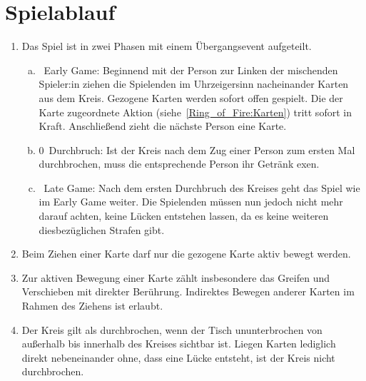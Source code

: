 \section{Spielablauf}
\begin{enumerate}[label={(\arabic*)}]
	\item
	Das Spiel ist in zwei Phasen mit einem Übergangsevent aufgeteilt.
	\begin{enumerate}[a.]
		\item
~\glqq{}Early Game\grqq{}:
		Beginnend mit der Person zur Linken der mischenden Spieler:in ziehen die Spielenden im Uhrzeigersinn nacheinander Karten aus dem Kreis.
		Gezogene Karten werden sofort offen gespielt.
		Die der Karte zugeordnete Aktion (siehe~\ref{Ring_of_Fire:Karten}) tritt sofort in Kraft.
		Anschließend zieht die nächste Person eine Karte.
		\item
0~\glqq{}Durchbruch\grqq{}:
		Ist der Kreis nach dem Zug einer Person zum ersten Mal durchbrochen, muss die entsprechende Person ihr Getränk exen.
		\item
~\glqq{}Late Game\grqq{}:
		Nach dem ersten Durchbruch des Kreises geht das Spiel wie im Early Game weiter.
		Die Spielenden müssen nun jedoch nicht mehr darauf achten, keine Lücken entstehen lassen, da es keine weiteren diesbezüglichen Strafen gibt.
	\end{enumerate}

	\item
	Beim Ziehen einer Karte darf nur die gezogene Karte aktiv bewegt werden.

	\item
	Zur aktiven Bewegung einer Karte zählt insbesondere das Greifen und Verschieben mit direkter Berührung.
	Indirektes Bewegen anderer Karten im Rahmen des Ziehens ist erlaubt.

	\item
	Der Kreis gilt als durchbrochen, wenn der Tisch ununterbrochen von außerhalb bis innerhalb des Kreises sichtbar ist.
	Liegen Karten lediglich direkt nebeneinander ohne, dass eine Lücke entsteht, ist der Kreis nicht durchbrochen.
\end{enumerate}

